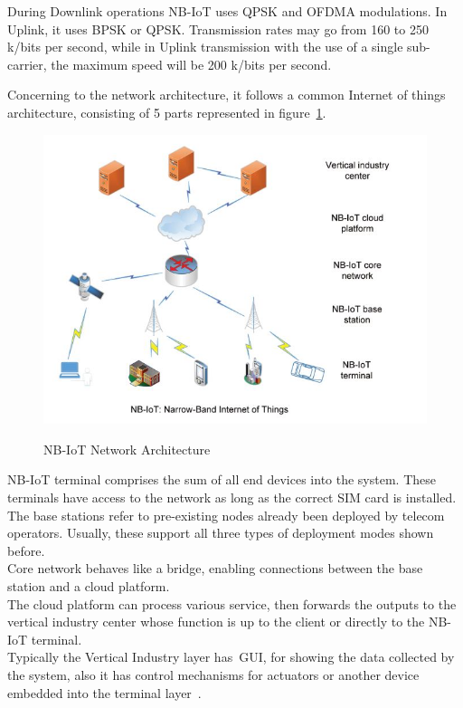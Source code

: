 During Downlink operations NB-IoT uses QPSK and OFDMA modulations. In Uplink, it uses BPSK or QPSK. Transmission rates may go from 160 to 250 k/bits per second, while in Uplink transmission with the use of a single sub-carrier, the maximum speed will be 200 k/bits per second.

Concerning to the network architecture, it follows a common Internet of things architecture, consisting  of 5 parts represented in figure~\ref{fig:NB_Network}.
\begin{figure}[htbp]
  \centering
  
    {\includegraphics[height=3 in,width=0.75\linewidth]{Chapters/Figures/NB-Network.JPG}}%
 
  \caption{NB-IoT Network Architecture~\cite{Chen2017}}
  \label{fig:NB_Network}
\end{figure}

NB-IoT terminal comprises the sum of all end devices into the system. These terminals have access to the network as long as the correct SIM card is installed.\\The base stations refer to pre-existing nodes already been deployed by telecom operators. Usually, these support all three types of deployment modes shown before.\\Core network behaves like a bridge, enabling connections between the base station and a cloud platform.\\The cloud platform can process various service, then forwards the  outputs to the vertical industry center whose function is up to the client or directly to the NB-IoT terminal.\\ Typically the Vertical Industry layer has~\gls{GUI}, for showing the data collected by the system, also it has control mechanisms for actuators or another device embedded into the terminal layer~\cite{Chen2017}.



